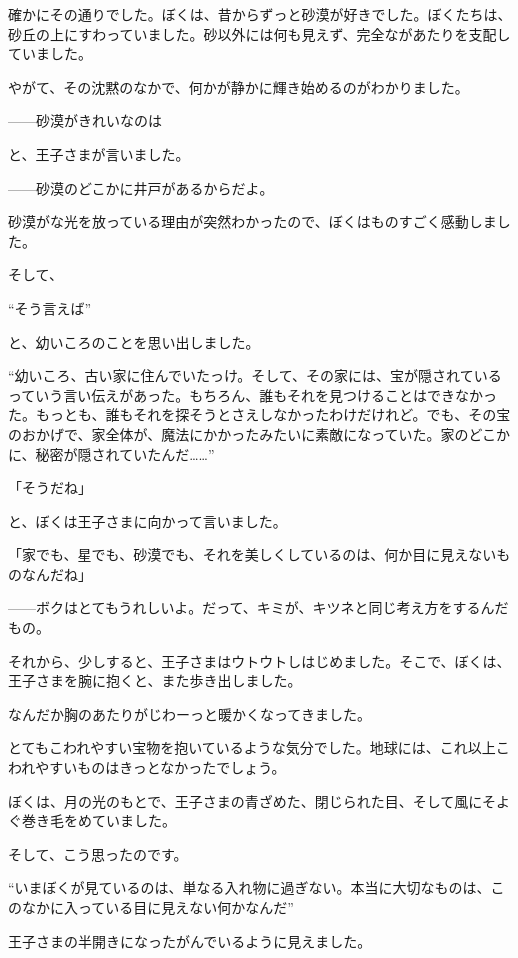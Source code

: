 
確かにその通りでした。ぼくは、昔からずっと砂漠が好きでした。ぼくたちは、砂丘の上にすわっていました。砂以外には何も見えず、完全ながあたりを支配していました。

やがて、その沈黙のなかで、何かが静かに輝き始めるのがわかりました。

——砂漠がきれいなのは

と、王子さまが言いました。

——砂漠のどこかに井戸があるからだよ。

砂漠がな光を放っている理由が突然わかったので、ぼくはものすごく感動しました。


そして、

“そう言えば”

と、幼いころのことを思い出しました。

“幼いころ、古い家に住んでいたっけ。そして、その家には、宝が隠されているっていう言い伝えがあった。もちろん、誰もそれを見つけることはできなかった。もっとも、誰もそれを探そうとさえしなかったわけだけれど。でも、その宝のおかげで、家全体が、魔法にかかったみたいに素敵になっていた。家のどこかに、秘密が隠されていたんだ……”

「そうだね」

と、ぼくは王子さまに向かって言いました。

「家でも、星でも、砂漠でも、それを美しくしているのは、何か目に見えないものなんだね」

——ボクはとてもうれしいよ。だって、キミが、キツネと同じ考え方をするんだもの。

それから、少しすると、王子さまはウトウトしはじめました。そこで、ぼくは、王子さまを腕に抱くと、また歩き出しました。

なんだか胸のあたりがじわーっと暖かくなってきました。

とてもこわれやすい宝物を抱いているような気分でした。地球には、これ以上こわれやすいものはきっとなかったでしょう。

ぼくは、月の光のもとで、王子さまの青ざめた、閉じられた目、そして風にそよぐ巻き毛をめていました。

そして、こう思ったのです。

“いまぼくが見ているのは、単なる入れ物に過ぎない。本当に大切なものは、このなかに入っている目に見えない何かなんだ”

王子さまの半開きになったがんでいるように見えました。

